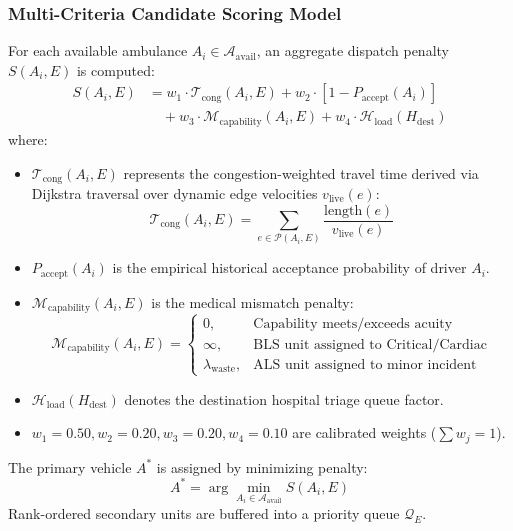\documentclass[conference]{IEEEtran}
\begin{document}
\subsubsection{Multi-Criteria Candidate Scoring Model}
For each available ambulance $A_i \in \mathcal{A}_{\text{avail}}$, an aggregate dispatch penalty $S(A_i, E)$ is computed:
\begin{equation}
\begin{split}
S(A_i, E) &= w_1 \cdot \mathcal{T}_{\text{cong}}(A_i, E) + w_2 \cdot [1 - P_{\text{accept}}(A_i)] \\
&\quad + w_3 \cdot \mathcal{M}_{\text{capability}}(A_i, E) + w_4 \cdot \mathcal{H}_{\text{load}}(H_{\text{dest}})
\end{split}
\end{equation}
where:
\begin{itemize}
    \item $\mathcal{T}_{\text{cong}}(A_i, E)$ represents the congestion-weighted travel time derived via Dijkstra traversal over dynamic edge velocities $v_{\text{live}}(e)$:
    \begin{equation}
    \mathcal{T}_{\text{cong}}(A_i, E) = \sum_{e \in \mathcal{P}(A_i, E)} \frac{\text{length}(e)}{v_{\text{live}}(e)}
    \end{equation}
    \item $P_{\text{accept}}(A_i)$ is the empirical historical acceptance probability of driver $A_i$.
    \item $\mathcal{M}_{\text{capability}}(A_i, E)$ is the medical mismatch penalty:
    \begin{equation}
    \mathcal{M}_{\text{capability}}(A_i, E) = \begin{cases}
    0, & \text{Capability meets/exceeds acuity} \\
    \infty, & \text{BLS unit assigned to Critical/Cardiac} \\
    \lambda_{\text{waste}}, & \text{ALS unit assigned to minor incident}
    \end{cases}
    \end{equation}
    \item $\mathcal{H}_{\text{load}}(H_{\text{dest}})$ denotes the destination hospital triage queue factor.
    \item $w_1 = 0.50, w_2 = 0.20, w_3 = 0.20, w_4 = 0.10$ are calibrated weights ($\sum w_j = 1$).
\end{itemize}

The primary vehicle $A^*$ is assigned by minimizing penalty:
\begin{equation}
A^* = \arg\min_{A_i \in \mathcal{A}_{\text{avail}}} S(A_i, E)
\end{equation}
Rank-ordered secondary units are buffered into a priority queue $\mathcal{Q}_E$.
\end{document}
